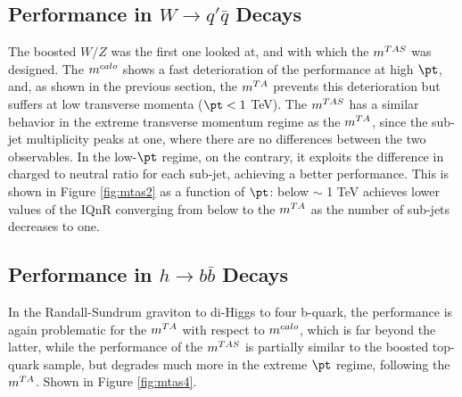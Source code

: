 
\subsection{Performance in $W \to q'\bar{q}$ Decays}
The boosted $W/Z$ was the first one looked at, and with which the $m^{TAS}$ was designed. The $m^{calo}$ shows a fast deterioration of the performance at high $\pt$, and, as shown in the previous section, the $m^{TA}$ prevents this deterioration but suffers at low transverse momenta ($\pt<1$ TeV).
The $m^{TAS}$ has a similar behavior in the extreme transverse momentum regime as the $m^{TA}$, since the sub-jet multiplicity peaks at one, where there are no differences between the two observables.
In the low-$\pt$ regime, on the contrary, it exploits the difference in charged to neutral ratio for each sub-jet, achieving a better performance.
This is shown in Figure \ref{fig:mtas2} as a function of $\pt$: below $\sim$ 1 TeV achieves lower values of the IQnR converging from below to the $m^{TA}$ as the number of sub-jets decreases to one.



\subsection{Performance in $h\to b\bar{b}$ Decays}
In the Randall-Sundrum graviton to di-Higgs to four b-quark, the performance is again problematic for the $m^{TA}$ with respect to $m^{calo}$, which is far beyond the latter, while the performance of the $m^{TAS}$ is partially similar to the boosted top-quark sample, but degrades much more in the extreme $\pt$ regime, following the $m^{TA}$. Shown in Figure \ref{fig:mtas4}.

